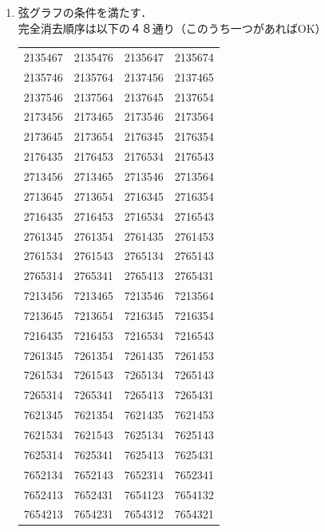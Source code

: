 \documentclass[dvipdfmx]{jarticle}
\begin{document}
\begin{enumerate}
\begin{enumerate}
          \item 弦グラフの条件を満たす．\\
                完全消去順序は以下の４８通り（このうち一つがあればOK）
                \begin{center}
                  \begin{tabular}{llll}
                    2135467 & 2135476 & 2135647 & 2135674 \\
                    2135746 & 2135764 & 2137456 & 2137465 \\
                    2137546 & 2137564 & 2137645 & 2137654 \\
                    2173456 & 2173465 & 2173546 & 2173564 \\
                    2173645 & 2173654 & 2176345 & 2176354 \\
                    2176435 & 2176453 & 2176534 & 2176543 \\
                    2713456 & 2713465 & 2713546 & 2713564 \\
                    2713645 & 2713654 & 2716345 & 2716354 \\
                    2716435 & 2716453 & 2716534 & 2716543 \\
                    2761345 & 2761354 & 2761435 & 2761453 \\
                    2761534 & 2761543 & 2765134 & 2765143 \\
                    2765314 & 2765341 & 2765413 & 2765431 \\[1ex]
                    7213456 & 7213465 & 7213546 & 7213564 \\
                    7213645 & 7213654 & 7216345 & 7216354 \\
                    7216435 & 7216453 & 7216534 & 7216543 \\
                    7261345 & 7261354 & 7261435 & 7261453 \\
                    7261534 & 7261543 & 7265134 & 7265143 \\
                    7265314 & 7265341 & 7265413 & 7265431 \\
                    7621345 & 7621354 & 7621435 & 7621453 \\
                    7621534 & 7621543 & 7625134 & 7625143 \\
                    7625314 & 7625341 & 7625413 & 7625431 \\
                    7652134 & 7652143 & 7652314 & 7652341 \\
                    7652413 & 7652431 & 7654123 & 7654132 \\
                    7654213 & 7654231 & 7654312 & 7654321 \\
                  \end{tabular}
                \end{center}


\end{enumerate}
\end{enumerate}
\end{document}
